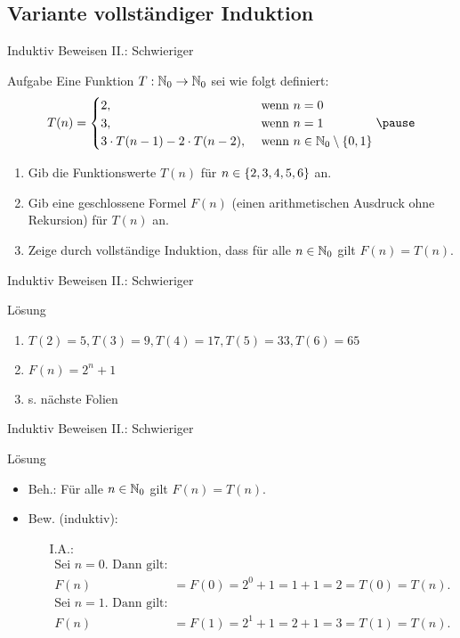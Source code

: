 \subsection{Variante vollständiger Induktion} %
\begin{frame}{Induktiv Beweisen II.: Schwieriger}
	\begin{exampleblock}{Aufgabe}
		Eine Funktion $T:\mathbb{N}_0 \rightarrow \mathbb{N}_0$ sei wie folgt definiert:
		\begin{equation}
		T(n) = 
			\begin{cases}
			 2, &\text{ wenn } n=0 \\
			 3, &\text{ wenn } n=1 \\
			 3 \cdot T(n-1) - 2 \cdot T(n-2), &\text{ wenn }n \in \nN_0 \setminus \set{0,1}
		\end{cases} \pause
		\end{equation}
		\begin{enumerate}
			\item Gib die Funktionswerte $T(n)$ für $n \in \{ 2,3,4,5,6 \}$ an.
			\item Gib eine geschlossene Formel $F(n)$ (einen arithmetischen Ausdruck ohne Rekursion) für $T(n)$ an.
			\item Zeige durch vollständige Induktion, dass für alle $n \in \mathbb{N}_0$ gilt $F(n) = T(n)$.
		\end{enumerate}
	\end{exampleblock}
\end{frame}
\begin{frame}{Induktiv Beweisen II.: Schwieriger}
	\begin{block}{Lösung}
		\begin{enumerate}
			\item $ T(2)=5,T(3)=9, T(4)=17, T(5)=33, T(6)=65$
			\item $F(n) = 2^n+1$
			\item s. nächste Folien
		\end{enumerate}
	\end{block}
\end{frame}
\begin{frame}{Induktiv Beweisen II.: Schwieriger}
	\begin{block}{Lösung}
		 	\begin{itemize}
		 		\item Beh.: Für alle $n \in \mathbb{N}_0$ gilt $F(n) = T(n)$.
		 		\item Bew. (induktiv): 
				\begin{itemize}
					\item[I.A.:]\begin{align*} 
											\text{Sei }n=0 \text{. Dann gilt: } \\ 
												F(n)&=F(0)=2^0+1=1+1=2=T(0)=T(n).\\
							 				\text{Sei }n=1 \text{. Dann gilt:  } \\
							 					F(n)&=F(1)=2^1+1=2+1=3=T(1)=T(n).
							 \end{align*}
				\end{itemize}
		 	\end{itemize}				  
	\end{block}
\end{frame}
